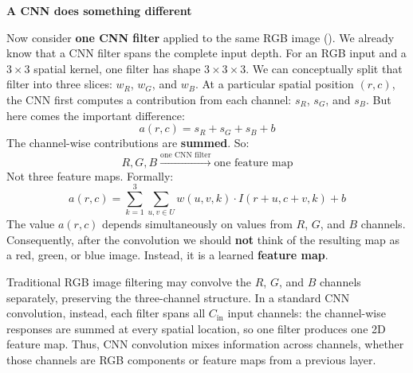 \highspace
\begin{flushleft}
    \textcolor{Green3}{ \textbf{A CNN does something different}}
\end{flushleft}
Now consider \textbf{one CNN filter} applied to the same RGB image (). We already know that a CNN filter spans the complete input depth. For an RGB input and a $3 \times 3$ spatial kernel, one filter has shape $3 \times 3 \times 3$. We can conceptually split that filter into three slices: $w_R$, $w_G$, and $w_B$. At a particular spatial position $(r,c)$, the CNN first computes a contribution from each channel: $s_R$, $s_G$, and $s_B$. But here comes the important difference:
\begin{equation*}
    a(r,c) = s_R + s_G + s_B + b
\end{equation*}
The channel-wise contributions are \textbf{summed}. So:
\begin{equation*}
    R, G, B \xrightarrow{\text{one CNN filter}} \text{one feature map}
\end{equation*}
Not three feature maps. Formally:
\begin{equation*}
    a(r,c) = \sum_{k=1}^{3} \sum_{u,v \in U} w(u,v,k) \cdot I(r+u, c+v, k) + b
\end{equation*}
The value $a(r,c)$ depends simultaneously on values from $R$, $G$, and $B$ channels. Consequently, after the convolution we should \textbf{not} think of the resulting map as a red, green, or blue image. Instead, it is a learned \textbf{feature map}.

\begin{takeawaysbox}
    Traditional RGB image filtering may convolve the $R$, $G$, and $B$ channels separately, preserving the three-channel structure. In a standard CNN convolution, instead, each filter spans all $C_{\text{in}}$ input channels: the channel-wise responses are summed at every spatial location, so one filter produces one 2D feature map. Thus, CNN convolution mixes information across channels, whether those channels are RGB components or feature maps from a previous layer.
\end{takeawaysbox}
